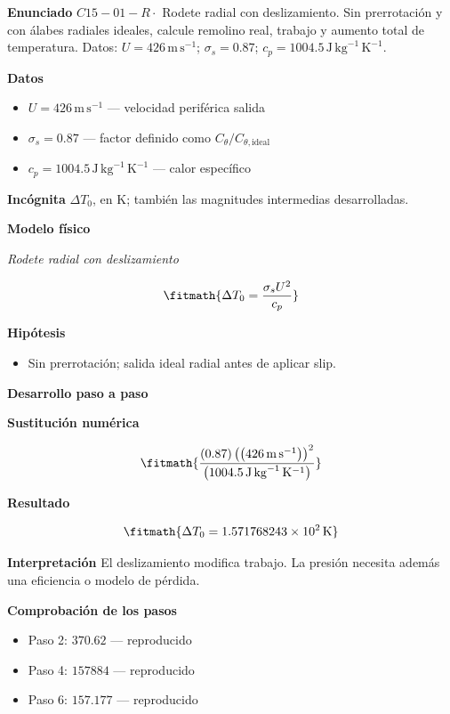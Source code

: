 \documentclass[10pt,openany]{book}
\begin{document}
\begin{tcolorbox}[title={Problema resuelto 1}, studiumworked, breakable]

\noindent\textbf{Enunciado}
\(C15-01-R \cdot\) Rodete radial con deslizamiento. Sin prerrotación y con álabes radiales ideales, calcule remolino real, trabajo y aumento total de temperatura. Datos: \(U=426\, \mathrm{m}\,\mathrm{s}^{-1}\); \(\sigma_s=0.87\); \(c_p=1004.5\, \mathrm{J}\,\mathrm{kg}^{-1}\,\mathrm{K}^{-1}\).

\noindent\textbf{Datos}
\begin{itemize}
\item $U = 426\,\mathrm{m}\,\mathrm{s}^{-1}$ — velocidad periférica salida
\item $\sigma_s = 0.87$ — factor definido como $C_\theta/C_{\theta,\mathrm{ideal}}$
\item $c_p = 1004.5\,\mathrm{J}\,\mathrm{kg}^{-1}\,\mathrm{K}^{-1}$ — calor específico
\end{itemize}

\noindent\textbf{Incógnita}
$\Delta T_0$, en $\mathrm{K}$; también las magnitudes intermedias desarrolladas.

\noindent\textbf{Modelo físico}

\noindent\textit{Rodete radial con deslizamiento}

\[
\fitmath{\Delta T_0=\frac{\sigma_s U^{2}}{c_p}}
\]

\noindent\textbf{Hipótesis}
\begin{itemize}
\item Sin prerrotación; salida ideal radial antes de aplicar slip.
\end{itemize}

\noindent\textbf{Desarrollo paso a paso}



\noindent\textbf{Sustitución numérica}

\[
\fitmath{\frac{\left(0.87\right) \left(\left(426\,\mathrm{m}\,\mathrm{s}^{-1}\right)\right)^{2}}{\left(1004.5\,\mathrm{J}\,\mathrm{kg}^{-1}\,\mathrm{K}^{-1}\right)}}
\]

\noindent\textbf{Resultado}

\[
\fitmath{\Delta T_0=1.571768243\times10^{2}\,\mathrm{K}}
\]

\noindent\textbf{Interpretación}
El deslizamiento modifica trabajo. La presión necesita además una eficiencia o modelo de pérdida.

\noindent\textbf{Comprobación de los pasos}
\begin{itemize}
\item Paso 2: $370.62$ — reproducido
\item Paso 4: $157884$ — reproducido
\item Paso 6: $157.177$ — reproducido
\end{itemize}


\end{tcolorbox}
\end{document}
